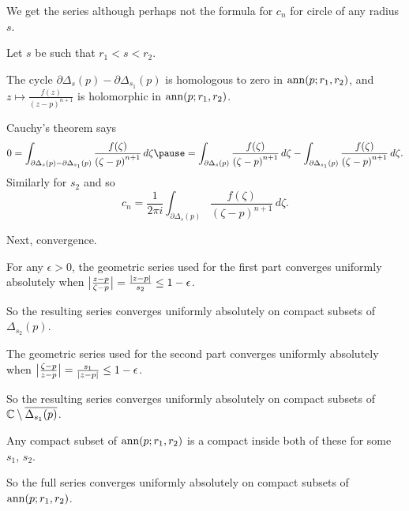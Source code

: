 \documentclass[10pt,aspectratio=169]{beamer}
\begin{document}
\begin{frame}
We get the series although perhaps not the formula for $c_n$ for
circle of any radius $s$.

\medskip
\pause

Let $s$ be such that
$r_1 < s < r_2$.

\medskip
\pause

The cycle
$\partial \Delta_{s}(p) - \partial \Delta_{s_1}(p)$ is homologous to zero in
$\operatorname{ann}(p;r_1,r_2)$, and 
$z \mapsto \frac{f(z)}{{(z-p)}^{n+1}}$ is holomorphic in 
$\operatorname{ann}(p;r_1,r_2)$.

\medskip
\pause

Cauchy's theorem says
\[
0 = \int_{\partial \Delta_{s}(p) - \partial \Delta_{s_1}(p)}
\frac{f(\zeta)}{{(\zeta-p)}^{n+1}} \, d\zeta
\pause
=
\int_{\partial \Delta_{s}(p)}
\frac{f(\zeta)}{{(\zeta-p)}^{n+1}} \, d\zeta
-
\int_{\partial \Delta_{s_1}(p)}
\frac{f(\zeta)}{{(\zeta-p)}^{n+1}} \, d\zeta .
\]
\pause
Similarly for $s_2$ and so
\[
c_n = \frac{1}{2\pi i}
\int_{\partial \Delta_{s}(p)} \frac{f(\zeta)}{{(\zeta-p)}^{n+1}}
 \, d\zeta .
\]
\end{frame}

\begin{frame}
Next, convergence.

\medskip
\pause
For any $\epsilon > 0$,
the geometric series used for the first part converges uniformly
absolutely when $\bigl\lvert {\frac{z-p}{\zeta-p}} \bigr\rvert = \frac{\lvert {z-p} \rvert}{s_2} \leq
1-\epsilon$.

\medskip

So the resulting series converges uniformly absolutely on compact
subsets of $\Delta_{s_2}(p)$.


\medskip
\pause
The geometric series used for the second part converges uniformly
absolutely when $\bigl\lvert {\frac{\zeta-p}{z-p}} \bigr\rvert = \frac{s_1}{\lvert {z-p} \rvert} \leq
1-\epsilon$.

\medskip

So the resulting series converges uniformly absolutely on compact
subsets of ${\mathbb{C}} \setminus \overline{\Delta_{s_1}(p)}$.


\medskip
\pause

Any compact subset of $\operatorname{ann}(p;r_1,r_2)$ is a compact
inside both of these for some $s_1$, $s_2$.

\medskip
\pause

So the full series converges uniformly absolutely on compact subsets of
$\operatorname{ann}(p;r_1,r_2)$.
\end{frame}
\end{document}
